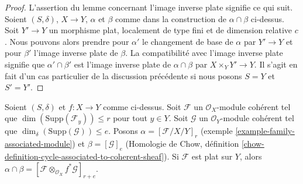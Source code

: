 \begin{proof}
\medskip\noindent
 L'assertion du lemme concernant l'image inverse plate signifie ce qui suit. 
Soient $(S, \delta)$, $X \to Y$, $\alpha$ et $\beta$ comme dans la
 construction de $\alpha \cap \beta$ ci-dessus. Soit $Y' \to Y$ un morphisme
 plat, localement de type fini et de dimension relative $c$. Nous pouvons
 alors prendre pour $\alpha'$ le changement de base de $\alpha$ par $Y' \to Y$
 et pour $\beta'$ l'image inverse plate de $\beta$. La compatibilité avec l'image inverse
 plate signifie que $\alpha' \cap \beta'$ est l'image inverse plate de 
$\alpha \cap \beta$ par $X \times_Y Y' \to Y$. Il s'agit en fait d'un
 cas particulier de la discussion précédente si nous posons $S = Y$ et $S' = Y'$. 
\end{proof} 

\begin{lemma} 
\label{lemma-action-coherent} 
Soient $(S, \delta)$ et $f : X \to Y$ comme ci-dessus. 
Soit $\mathcal{F}$ un $\mathcal{O}_X$-module cohérent
 tel que $\dim(\text{Supp}(\mathcal{F}_y)) \leq r$ pour tout $y \in Y$.
 Soit $\mathcal{G}$ un $\mathcal{O}_Y$-module cohérent
 tel que $\dim_\delta(\text{Supp}(\mathcal{G})) \leq e$. 
Posons $\alpha = [\mathcal{F}/X/Y]_r$
 (exemple \ref{example-family-associated-module}) et 
$\beta = [\mathcal{G}]_e$ (Homologie de Chow, définition 
\ref{chow-definition-cycle-associated-to-coherent-sheaf}). 
Si $\mathcal{F}$ est plat sur $Y$, alors $\alpha \cap \beta =
[\mathcal{F} \otimes_{\mathcal{O}_X} f^*\mathcal{G}]_{r + e}$. 
\end{lemma} 

